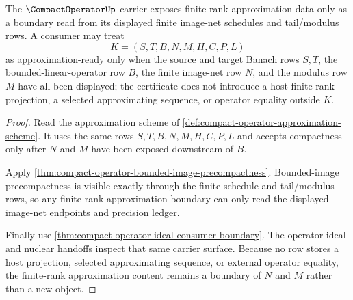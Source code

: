 \begin{theorem}
\label{thm:compact-operator-finite-rank-approximation-boundary}
The $\CompactOperatorUp$ carrier exposes finite-rank approximation data only as a boundary read from its displayed finite image-net schedules and tail/modulus rows. A consumer may treat
$$
K=(S,T,B,N,M,H,C,P,L)
$$
as approximation-ready only when the source and target Banach rows $S,T$, the bounded-linear-operator row $B$, the finite image-net row $N$, and the modulus row $M$ have all been displayed; the certificate does not introduce a host finite-rank projection, a selected approximating sequence, or operator equality outside $K$.
\end{theorem}
\begin{proof}
Read the approximation scheme of \autoref{def:compact-operator-approximation-scheme}. It uses the same rows $S,T,B,N,M,H,C,P,L$ and accepts compactness only after $N$ and $M$ have been exposed downstream of $B$.

Apply \autoref{thm:compact-operator-bounded-image-precompactness}. Bounded-image precompactness is visible exactly through the finite schedule and tail/modulus rows, so any finite-rank approximation boundary can only read the displayed image-net endpoints and precision ledger.

Finally use \autoref{thm:compact-operator-ideal-consumer-boundary}. The operator-ideal and nuclear handoffs inspect that same carrier surface. Because no row stores a host projection, selected approximating sequence, or external operator equality, the finite-rank approximation content remains a boundary of $N$ and $M$ rather than a new object.
\end{proof}


